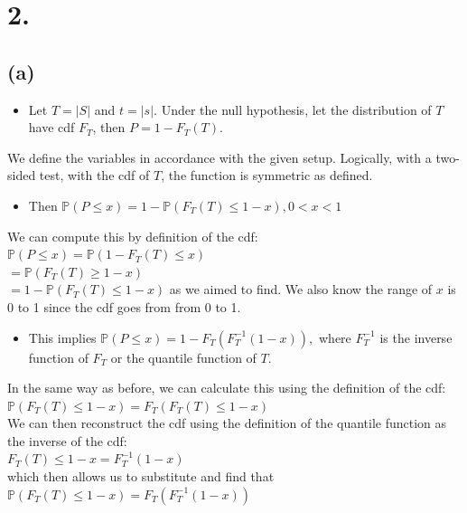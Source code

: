\documentclass{article}
\begin{document}
\section*{2.}
{\Large 
\subsection*{(a)}

\begin{itemize}
  \item Let $T = |S|$ and $t = |s|$. Under the null hypothesis, let the distribution of $T$ have cdf $F_T$, then $P = 1 - F_T(T).$
\end{itemize}
We define the variables in accordance with the given setup. Logically, with a two-sided test, with the cdf of $T$, the function is symmetric as defined.

\begin{itemize}
  \item Then $\mathbb{P}(P \leq x) = 1 - \mathbb{P}(F_T(T) \leq 1 - x), 0 < x < 1$
\end{itemize}
We can compute this by definition of the cdf: \\
$\mathbb{P}(P \leq x) = \mathbb{P}(1-F_T(T) \leq x)$ \\
$= \mathbb{P}(F_T(T) \geq 1-x)$ \\
$= 1 - \mathbb{P}(F_T(T) \leq 1-x)$ as we aimed to find. We also know the range of $x$ is 0 to 1 since the cdf goes from from 0 to 1.
\begin{itemize}
  \item This implies $\mathbb{P}(P \leq x) = 1 - F_T(F_T^{-1}(1-x)),$ where $F_T^{-1}$ is the inverse function of $F_T$ or the quantile function of $T$. 
\end{itemize}
In the same way as before, we can calculate this using the definition of the cdf: \\
$\mathbb{P}(F_T(T) \leq 1 - x) = F_T(F_T(T) \leq 1-x)$ \\
We can then reconstruct the cdf using the definition of the quantile function as the inverse of the cdf: \\
$F_T(T) \leq 1 - x = F_T^{-1}(1-x)$ \\
which then allows us to substitute and find that \\
$\mathbb{P}(F_T(T) \leq 1 - x) = F_T(F_T^{-1}(1-x))$

}
\end{document}
